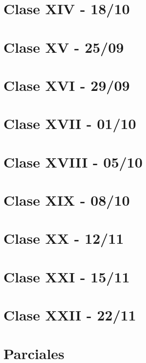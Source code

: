 \documentclass[12pt,a4paper]{book}
\begin{document}
\chapter{Clase XIV - 18/10}

\newpage\thispagestyle{empty}\blankpage

\chapter{Clase XV - 25/09}

\newpage\thispagestyle{empty}\blankpage

\chapter{Clase XVI - 29/09}

\newpage\thispagestyle{empty}\blankpage

\chapter{Clase XVII - 01/10}

\newpage\thispagestyle{empty}\blankpage

\chapter{Clase XVIII - 05/10}

\newpage\thispagestyle{empty}\blankpage

\chapter{Clase XIX - 08/10}

\newpage\thispagestyle{empty}\blankpage

\chapter{Clase XX - 12/11}

\newpage\thispagestyle{empty}\blankpage

\chapter{Clase XXI - 15/11}

\newpage\thispagestyle{empty}\blankpage

\chapter{Clase XXII - 22/11}

\newpage\thispagestyle{empty}\blankpage

\chapter{Parciales}


\blankpage



\nocite{*}
\end{document}
